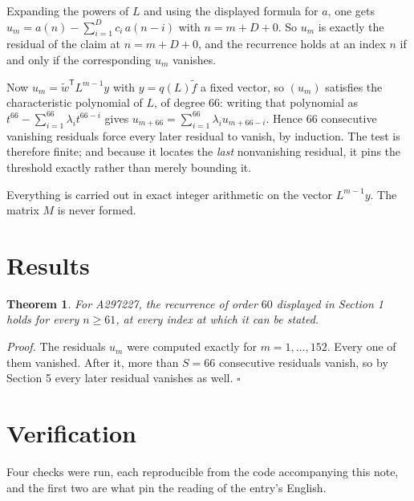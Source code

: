 \documentclass[11pt]{article}
\newtheorem{theorem}{Theorem}
\theoremstyle{definition}
\begin{document}
Expanding the powers of $L$ and using the displayed formula for $a$, one gets $u_m = a(n) - \sum_{i=1}^{D} c_i\,a(n-i)$ with $n = m + D + 0$. So $u_m$ is exactly the residual of the claim at $n = m + D + 0$, and the recurrence holds at an index $n$ if and only if the corresponding $u_m$ vanishes.

Now $u_m = \tilde w^{\mathsf T} L^{m-1} y$ with $y = q(L)\tilde f$ a fixed vector, so $(u_m)$ satisfies the characteristic polynomial of $L$, of degree $66$: writing that polynomial as $t^{66} - \sum_{i=1}^{66} \lambda_i t^{66-i}$ gives $u_{m+66} = \sum_{i=1}^{66} \lambda_i u_{m+66-i}$. Hence $66$ consecutive vanishing residuals force every later residual to vanish, by induction. The test is therefore finite; and because it locates the {\itshape last} nonvanishing residual, it pins the threshold exactly rather than merely bounding it.

Everything is carried out in exact integer arithmetic on the vector $L^{m-1}y$. The matrix $M$ is never formed.

\section{Results}

\begin{theorem} For A297227, the recurrence of order $60$ displayed in Section 1 holds for every $n \ge 61$, at every index at which it can be stated.\end{theorem}

{\itshape Proof.} The residuals $u_m$ were computed exactly for $m = 1,\dots,152$. Every one of them vanished. After it, more than $S = 66$ consecutive residuals vanish, so by Section 5 every later residual vanishes as well. $\square$

\section{Verification}

Four checks were run, each reproducible from the code accompanying this note, and the first two are what pin the reading of the entry's English.
\end{document}
